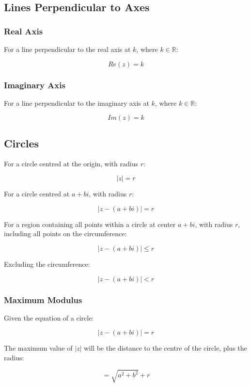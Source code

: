 \documentclass[a4paper,11pt]{report}
\begin{document}
\subsection{Lines Perpendicular to Axes}

\subsubsection{Real Axis}

For a line perpendicular to the real axis at $k$, where $k \in \mathbb{R}$:

$$
Re(z) = k
$$

\subsubsection{Imaginary Axis}

For a line perpendicular to the imaginary axis at $k$, where $k \in \mathbb{R}$:

$$
Im(z) = k
$$

\subsection{Circles}

For a circle centred at the origin, with radius $r$:

$$
\lvert z \rvert = r
$$

For a circle centred at $a + bi$, with radius $r$:

$$
\lvert z - (a + bi) \rvert = r
$$

For a region containing all points within a circle at center $a + bi$, with
radius $r$, including all points on the circumference:

$$
\lvert z - (a + bi) \rvert \leq r
$$

Excluding the circumference:

$$
\lvert z - (a + bi) \rvert < r
$$

\subsubsection{Maximum Modulus}

Given the equation of a circle:

$$
\lvert z - (a + bi) \rvert = r
$$

The maximum value of $\lvert z \rvert$ will be the distance to the centre of
the circle, plus the radius:

$$
= \sqrt{a^2 + b^2} + r
$$
\end{document}
